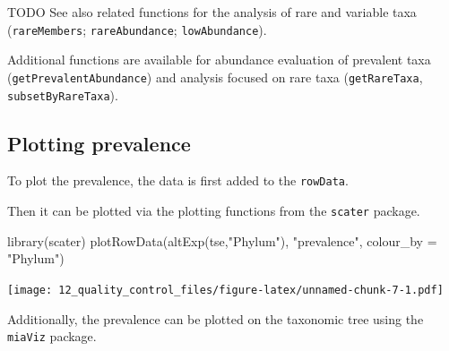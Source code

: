 \documentclass[
]{book}
\newenvironment{Shaded}{\begin{snugshade}}{\end{snugshade}}
\newcommand{\AttributeTok}[1]{\textcolor[rgb]{0.77,0.63,0.00}{#1}}
\newcommand{\ConstantTok}[1]{\textcolor[rgb]{0.00,0.00,0.00}{#1}}
\newcommand{\DecValTok}[1]{\textcolor[rgb]{0.00,0.00,0.81}{#1}}
\newcommand{\FunctionTok}[1]{\textcolor[rgb]{0.00,0.00,0.00}{#1}}
\newcommand{\NormalTok}[1]{#1}
\newcommand{\OtherTok}[1]{\textcolor[rgb]{0.56,0.35,0.01}{#1}}
\newcommand{\SpecialCharTok}[1]{\textcolor[rgb]{0.00,0.00,0.00}{#1}}
\newcommand{\StringTok}[1]{\textcolor[rgb]{0.31,0.60,0.02}{#1}}
\begin{document}
TODO
See also related functions for the analysis of rare and variable taxa (\texttt{rareMembers}; \texttt{rareAbundance}; \texttt{lowAbundance}).

Additional functions are available for abundance evaluation of prevalent taxa (\texttt{getPrevalentAbundance}) and analysis focused on rare taxa (\texttt{getRareTaxa}, \texttt{subsetByRareTaxa}).

\hypertarget{plotting-prevalence}{%
\subsection{Plotting prevalence}\label{plotting-prevalence}}

To plot the prevalence, the data is first added to the \texttt{rowData}.

\begin{Shaded}
\end{Shaded}

Then it can be plotted via the plotting functions from the \texttt{scater} package.

\begin{Shaded}
\begin{Highlighting}[]
\FunctionTok{library}\NormalTok{(scater)}
\FunctionTok{plotRowData}\NormalTok{(}\FunctionTok{altExp}\NormalTok{(tse,}\StringTok{"Phylum"}\NormalTok{), }\StringTok{"prevalence"}\NormalTok{, }\AttributeTok{colour\_by =} \StringTok{"Phylum"}\NormalTok{)}
\end{Highlighting}
\end{Shaded}

\texttt{[image: 12\_quality\_control\_files/figure-latex/unnamed-chunk-7-1.pdf]}

Additionally, the prevalence can be plotted on the taxonomic tree using the
\texttt{miaViz} package.
\end{document}
